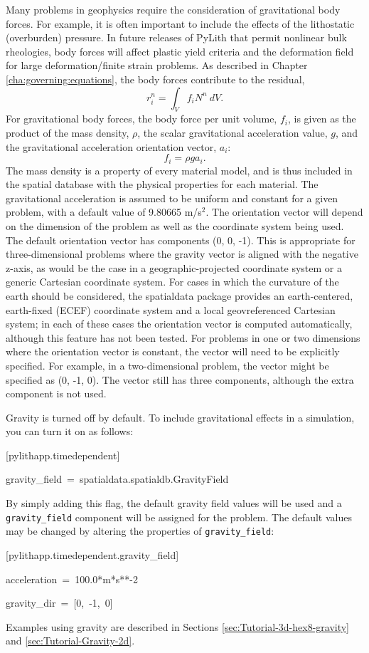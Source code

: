 Many problems in geophysics require the consideration of gravitational
body forces. For example, it is often important to include the effects
of the lithostatic (overburden) pressure. In future releases of PyLith
that permit nonlinear bulk rheologies, body forces will affect plastic
yield criteria and the deformation field for large deformation/finite
strain problems. As described in Chapter \vref{cha:governing:equations},
the body forces contribute to the residual,
\begin{equation}
r_{i}^{n}=\int_{V}f_{i}N^{n}\: dV.
\end{equation}
For gravitational body forces, the body force per unit volume, $f_{i}$,
is given as the product of the mass density, $\rho$, the scalar gravitational
acceleration value, $g$, and the gravitational acceleration orientation
vector, $a_{i}$:
\begin{equation}
f_{i}=\rho ga_{i}.
\end{equation}
The mass density is a property of every material model, and is thus
included in the spatial database with the physical properties for
each material. The gravitational acceleration is assumed to be uniform
and constant for a given problem, with a default value of 9.80665
m/s$^{\text{2}}$. The orientation vector will depend on the dimension
of the problem as well as the coordinate system being used. The default
orientation vector has components (0, 0, -1). This is appropriate
for three-dimensional problems where the gravity vector is aligned
with the negative z-axis, as would be the case in a geographic-projected
coordinate system or a generic Cartesian coordinate system. For cases
in which the curvature of the earth should be considered, the spatialdata
package provides an earth-centered, earth-fixed (ECEF) coordinate
system and a local geovreferenced Cartesian system; in each of these
cases the orientation vector is computed automatically, although this
feature has not been tested. For problems in one or two dimensions
where the orientation vector is constant, the vector will need to
be explicitly specified. For example, in a two-dimensional problem,
the vector might be specified as (0, -1, 0). The vector still has
three components, although the extra component is not used.

Gravity is turned off by default. To include gravitational effects
in a simulation, you can turn it on as follows:
\begin{lyxcode}
{[}pylithapp.timedependent{]}

gravity\_field~=~spatialdata.spatialdb.GravityField
\end{lyxcode}
By simply adding this flag, the default gravity field values will
be used and a \texttt{gravity\_field} component will be assigned for
the problem. The default values may be changed by altering the properties
of \texttt{gravity\_field}:
\begin{lyxcode}
{[}pylithapp.timedependent.gravity\_field{]}

acceleration~=~100.0{*}m{*}s{*}{*}-2

gravity\_dir~=~{[}0,~-1,~0{]}
\end{lyxcode}
Examples using gravity are described in Sections \vref{sec:Tutorial-3d-hex8-gravity}
and \vref{sec:Tutorial-Gravity-2d}.
